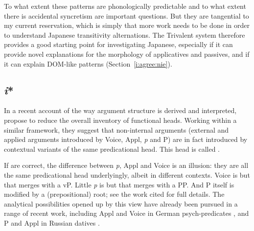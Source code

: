\begin{exe}
\begin{xlist}
\begin{xlist}
\begin{xlist}
\begin{xlist}
\begin{xlist}
\begin{xlist}
\begin{exe}
\begin{xlist}
\begin{exe}
\begin{exe}
\begin{xlist}
\begin{exe}
\begin{exe}
\begin{xlist}
\begin{exe}
\begin{xlist}
\begin{exe}
\begin{xlist}
\begin{exe}
\begin{xlist}
To what extent these patterns are phonologically predictable and to what extent there is accidental syncretism are important questions. But they are tangential to my current reservation, which is simply that more work needs to be done in order to understand Japanese transitivity alternations. The Trivalent system therefore provides a good starting point for investigating Japanese, especially if it can provide novel explanations for the morphology of applicatives and passives, and if it can explain DOM-like patterns (Section~\ref{i:agree:nie}).

	\subsection{\emph{i}*} \label{i:i:i}
In a recent account of the way argument structure is derived and interpreted, \cite{woodmarantz17} propose to reduce the overall inventory of functional heads. Working within a similar framework, they suggest that non-internal arguments (external and applied arguments introduced by Voice, Appl, \emph{p} and P) are in fact introduced by contextual variants of the same predicational head. This head is called \emph{}. 

If \cite{woodmarantz17} are correct, the difference between \emph{p}, Appl and Voice is an illusion: they are all the same predicational head underlyingly, albeit in different contexts. Voice is but \emph{} that merges with a vP. Little \emph{p} is but \emph{} that merges with a PP. And P itself is \emph{} modified by a (prepositional) root; see the work cited for full details. The analytical possibilities opened up by this view have already been pursued in a range of recent work, including Appl and Voice in German psych-predicates \citep{hirsch18phd}, and P and Appl in Russian datives \citep{bonehnash17}.


\end{xlist}
\end{exe}
\end{xlist}
\end{exe}
\end{xlist}
\end{exe}
\end{xlist}
\end{exe}
\end{exe}
\end{xlist}
\end{exe}
\end{exe}
\end{xlist}
\end{exe}
\end{xlist}
\end{xlist}
\end{xlist}
\end{xlist}
\end{xlist}
\end{xlist}
\end{exe}
